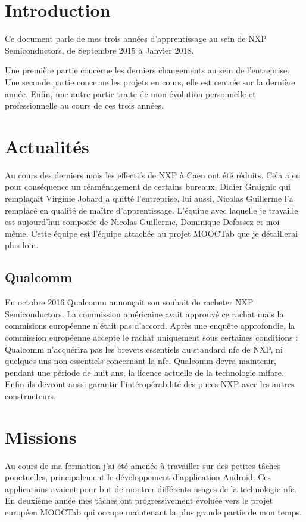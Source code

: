 \documentclass[french,12pt,a4paper,titlepage,openright,openbib]{report}
\begin{document}
\chapter{Introduction}

Ce document parle de mes trois années d'apprentissage au sein de NXP Semiconductors, de Septembre 2015 à Janvier 2018.

Une première partie concerne les derniers changements au sein de l'entreprise.
Une seconde partie concerne les projets en cours, elle est centrée sur la dernière année.
Enfin, une autre partie traite de mon évolution personnelle et professionnelle au cours de ces trois années.

\chapter{Actualités}

Au cours des derniers mois les effectifs de NXP à Caen ont été réduits. Cela a eu pour conséquence un réaménagement de certains bureaux.
Didier Graignic qui remplaçait Virginie Jobard a quitté l'entreprise, lui aussi, Nicolas Guillerme l'a remplacé en qualité de maître d'apprentissage.
L'équipe avec laquelle je travaille est aujourd'hui composée de Nicolas Guillerme, Dominique Defossez et moi même. Cette équipe est l'équipe attachée au projet MOOCTab que je détaillerai plus loin.


\section{Qualcomm}

En octobre 2016 Qualcomm annonçait son souhait de racheter NXP Semiconductors. La commission américaine avait approuvé ce rachat mais la commisions européenne n'était pas d'accord. Après une enquête approfondie, la commission européenne accepte le rachat uniquement sous certaines conditions :
Qualcomm n'acquérira pas les brevets essentiels au standard \gls{nfc} de NXP, ni quelques uns non-essentiels concernant la \gls{nfc}.
Qualcomm devra maintenir, pendant une période de huit ans, la licence actuelle de la technologie \gls{mifare}. Enfin ils devront aussi garantir l'intéropérabilité des puces NXP avec les autres constructeurs.

\chapter{Missions}
Au cours de ma formation j'ai été amenée à travailler sur des petites tâches ponctuelles, principalement le développement d'application Android. Ces applications avaient pour but de montrer différents usages de la technologie \gls{nfc}.
En deuxième année mes tâches ont progressivement évoluée vers le projet européen MOOCTab qui occupe maintenant la plus grande partie de mon temps.
\end{document}

